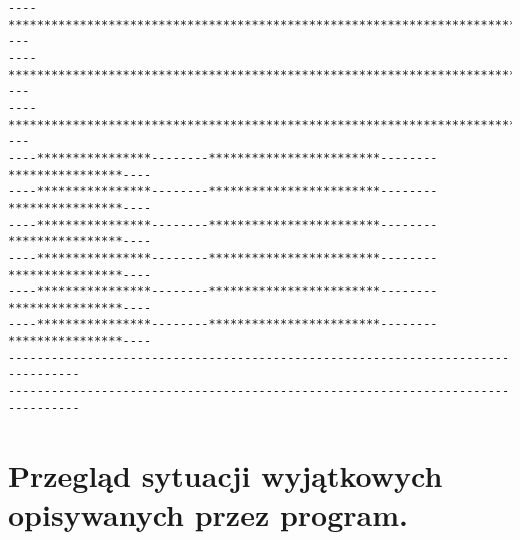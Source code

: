 \documentclass[a4paper]{article}
\begin{document}
\begin{verbatim}
----************************************************************************----
----************************************************************************----
----************************************************************************----
----****************--------************************--------****************----
----****************--------************************--------****************----
----****************--------************************--------****************----
----****************--------************************--------****************----
----****************--------************************--------****************----
----****************--------************************--------****************----
--------------------------------------------------------------------------------
--------------------------------------------------------------------------------
\end{verbatim}

\section{Przegląd sytuacji wyjątkowych opisywanych przez program.}
\end{document}
